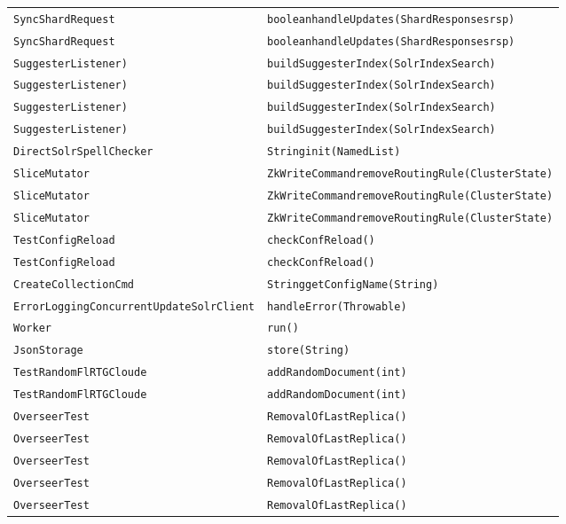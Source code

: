 \begin{center}
\begin{longtable}{ll}
\lstinline/SyncShardRequest/&{\lstinline/booleanhandleUpdates(ShardResponsesrsp)/}\\
\lstinline/SyncShardRequest/&{\lstinline/booleanhandleUpdates(ShardResponsesrsp)/}\\
\lstinline/SuggesterListener)/&{\lstinline/buildSuggesterIndex(SolrIndexSearch)/}\\
\lstinline/SuggesterListener)/&{\lstinline/buildSuggesterIndex(SolrIndexSearch)/}\\
\lstinline/SuggesterListener)/&{\lstinline/buildSuggesterIndex(SolrIndexSearch)/}\\
\lstinline/SuggesterListener)/&{\lstinline/buildSuggesterIndex(SolrIndexSearch)/}\\
\lstinline/DirectSolrSpellChecker/&{\lstinline/Stringinit(NamedList)/}\\
\lstinline/SliceMutator/&{\lstinline/ZkWriteCommandremoveRoutingRule(ClusterState)/}\\
\lstinline/SliceMutator/&{\lstinline/ZkWriteCommandremoveRoutingRule(ClusterState)/}\\
\lstinline/SliceMutator/&{\lstinline/ZkWriteCommandremoveRoutingRule(ClusterState)/}\\
\lstinline/TestConfigReload/&{\lstinline/checkConfReload()/}\\
\lstinline/TestConfigReload/&{\lstinline/checkConfReload()/}\\
\lstinline/CreateCollectionCmd/&{\lstinline/StringgetConfigName(String)/}\\
\lstinline/ErrorLoggingConcurrentUpdateSolrClient/&{\lstinline/handleError(Throwable)/}\\
\lstinline/Worker/&{\lstinline/run()/}\\
\lstinline/JsonStorage/&{\lstinline/store(String)/}\\
\lstinline/TestRandomFlRTGCloude/&{\lstinline/addRandomDocument(int)/}\\
\lstinline/TestRandomFlRTGCloude/&{\lstinline/addRandomDocument(int)/}\\
\lstinline/OverseerTest/&{\lstinline/RemovalOfLastReplica()/}\\
\lstinline/OverseerTest/&{\lstinline/RemovalOfLastReplica()/}\\
\lstinline/OverseerTest/&{\lstinline/RemovalOfLastReplica()/}\\
\lstinline/OverseerTest/&{\lstinline/RemovalOfLastReplica()/}\\
\lstinline/OverseerTest/&{\lstinline/RemovalOfLastReplica()/}\\

\end{longtable}
\end{center}
